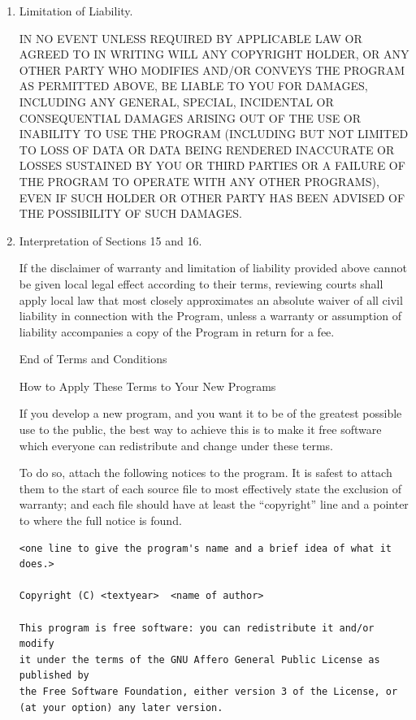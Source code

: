 \documentclass[11pt]{article}
\begin{document}
\begin{enumerate}
\item Limitation of Liability.

 IN NO EVENT UNLESS REQUIRED BY APPLICABLE LAW OR AGREED TO IN
 WRITING WILL ANY COPYRIGHT HOLDER, OR ANY OTHER PARTY WHO MODIFIES
 AND/OR CONVEYS THE PROGRAM AS PERMITTED ABOVE, BE LIABLE TO YOU FOR
 DAMAGES, INCLUDING ANY GENERAL, SPECIAL, INCIDENTAL OR CONSEQUENTIAL
 DAMAGES ARISING OUT OF THE USE OR INABILITY TO USE THE PROGRAM
 (INCLUDING BUT NOT LIMITED TO LOSS OF DATA OR DATA BEING RENDERED
 INACCURATE OR LOSSES SUSTAINED BY YOU OR THIRD PARTIES OR A FAILURE
 OF THE PROGRAM TO OPERATE WITH ANY OTHER PROGRAMS), EVEN IF SUCH
 HOLDER OR OTHER PARTY HAS BEEN ADVISED OF THE POSSIBILITY OF SUCH
 DAMAGES.

\item Interpretation of Sections 15 and 16.

If the disclaimer of warranty and limitation of liability provided
above cannot be given local legal effect according to their terms,
reviewing courts shall apply local law that most closely approximates
an absolute waiver of all civil liability in connection with the
Program, unless a warranty or assumption of liability accompanies a
copy of the Program in return for a fee.

\begin{center}
{\Large\sc End of Terms and Conditions}

\bigskip
How to Apply These Terms to Your New Programs
\end{center}

If you develop a new program, and you want it to be of the greatest
possible use to the public, the best way to achieve this is to make it
free software which everyone can redistribute and change under these terms.

To do so, attach the following notices to the program.  It is safest
to attach them to the start of each source file to most effectively
state the exclusion of warranty; and each file should have at least
the ``copyright'' line and a pointer to where the full notice is found.

{\footnotesize
\begin{verbatim}
<one line to give the program's name and a brief idea of what it does.>

Copyright (C) <textyear>  <name of author>

This program is free software: you can redistribute it and/or modify
it under the terms of the GNU Affero General Public License as published by
the Free Software Foundation, either version 3 of the License, or
(at your option) any later version.


\end{verbatim}}
\end{enumerate}
\end{document}

